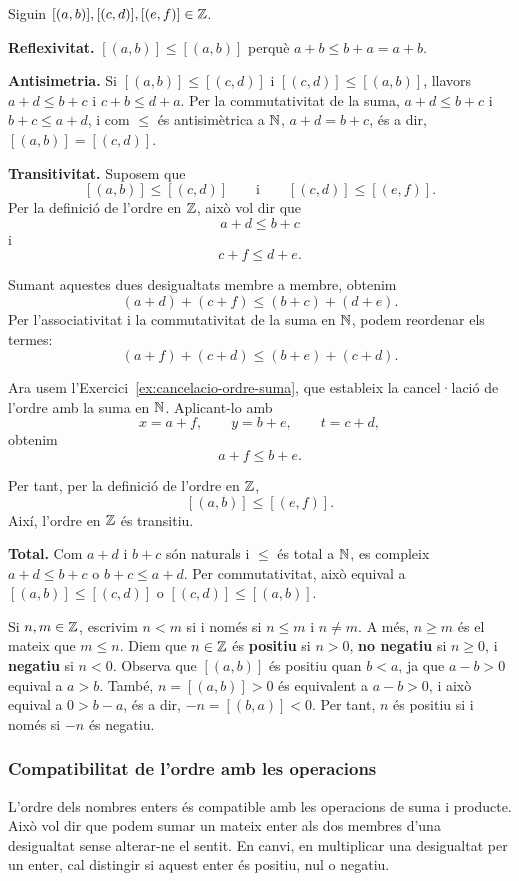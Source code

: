 \begin{prova}
Siguin $[(a,b)],[(c,d)],[(e,f)]\in \mathbb{Z}$.

\textbf{Reflexivitat.} $[(a,b)]\leq [(a,b)]$ perquè $a+b\leq b+a=a+b$.

\textbf{Antisimetria.} Si $[(a,b)]\leq [(c,d)]$ i $[(c,d)]\leq [(a,b)]$, llavors $a+d\leq b+c$ i $c+b\leq d+a$. Per la commutativitat de la suma, $a+d\leq b+c$ i $b+c\leq a+d$, i com $\leq$ és antisimètrica a $\mathbb{N}$, $a+d=b+c$, és a dir, $[(a,b)]=[(c,d)]$.

\textbf{Transitivitat.} Suposem que
\[
[(a,b)]\leq [(c,d)]
\qquad\text{i}\qquad
[(c,d)]\leq [(e,f)].
\]
Per la definició de l'ordre en $\mathbb{Z}$, això vol dir que
\[
a+d\leq b+c
\]
i
\[
c+f\leq d+e.
\]

Sumant aquestes dues desigualtats membre a membre, obtenim
\[
(a+d)+(c+f)\leq (b+c)+(d+e).
\]
Per l'associativitat i la commutativitat de la suma en $\mathbb{N}$, podem reordenar els termes:
\[
(a+f)+(c+d)\leq (b+e)+(c+d).
\]

Ara usem l'Exercici~\ref{ex:cancelacio-ordre-suma}, que estableix la cancel·lació de l'ordre amb la suma en $\mathbb{N}$. Aplicant-lo amb
\[
x=a+f,\qquad y=b+e,\qquad t=c+d,
\]
obtenim
\[
a+f\leq b+e.
\]

Per tant, per la definició de l'ordre en $\mathbb{Z}$,
\[
[(a,b)]\leq [(e,f)].
\]
Així, l'ordre en $\mathbb{Z}$ és transitiu.

\textbf{Total.} Com $a+d$ i $b+c$ són naturals i $\leq$ és total a $\mathbb{N}$, es compleix $a+d\leq b+c$ o $b+c\leq a+d$. Per commutativitat, això equival a $[(a,b)]\leq [(c,d)]$ o $[(c,d)]\leq [(a,b)]$.
\end{prova}

Si $n,m\in \mathbb{Z}$, escrivim $n<m$ si i només si $n\leq m$ i $n\neq m$. A més, $n\geq m$ és el mateix que $m\leq n$. Diem que $n\in \mathbb{Z}$ és \textbf{positiu} si $n>0$, \textbf{no negatiu} si $n\geq 0$, i \textbf{negatiu} si $n<0$. Observa que $[(a,b)]$ és positiu quan $b<a$, ja que $a-b>0$ equival a $a>b$. També, $n=[(a,b)]>0$ és equivalent a $a-b>0$, i això equival a $0>b-a$, és a dir, $-n=[(b,a)]<0$. Per tant, $n$ és positiu si i només si $-n$ és negatiu.

\subsubsection{Compatibilitat de l'ordre amb les operacions}

L'ordre dels nombres enters és compatible amb les operacions de suma i producte. Això vol dir que podem sumar un mateix enter als dos membres d'una desigualtat sense alterar-ne el sentit. En canvi, en multiplicar una desigualtat per un enter, cal distingir si aquest enter és positiu, nul o negatiu.

